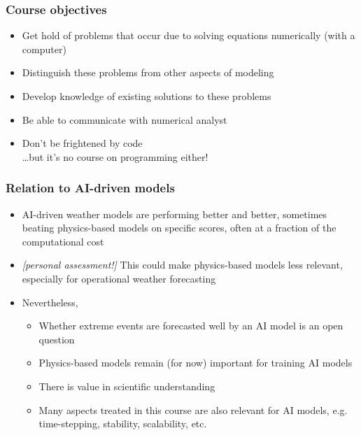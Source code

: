 \documentclass[aspectratio=149,9pt]{beamer}
\begin{document}
%
%
\begin{frame}
	\frametitle{Course objectives}
	\begin{itemize}
		\item Get hold of problems that occur due to solving equations numerically (with a computer)\\[3ex]
\pause
		\item Distinguish these problems from other aspects of modeling
		\item Develop knowledge of existing solutions to these problems
		\item Be able to communicate with numerical analyst\\[3ex]
\pause
		\item Don't be frightened by code\\ \quad\ldots but it's no course on programming either!
	\end{itemize}
\end{frame}
%
%
\begin{frame}
	\frametitle{Relation to AI-driven models}
	\begin{itemize}
		\item AI-driven weather models are performing better and better, sometimes beating physics-based models on specific scores, often at a fraction of the computational cost\\[3ex]
		\item \emph{[personal assessment!]} This could make physics-based models less relevant, especially for operational weather forecasting\\[3ex]
		\item Nevertheless,\\[1ex]
		    \begin{itemize}
                \item Whether extreme events are forecasted well by an AI model is an open question\\[1ex]
		        \item Physics-based models remain (for now) important for training AI models\\[1ex]
		        \item There is value in scientific understanding\\[1ex]
		        \item Many aspects treated in this course are also relevant for AI models, e.g. time-stepping, stability, scalability, etc.
		    \end{itemize}
	\end{itemize}
\end{frame}
\end{document}
